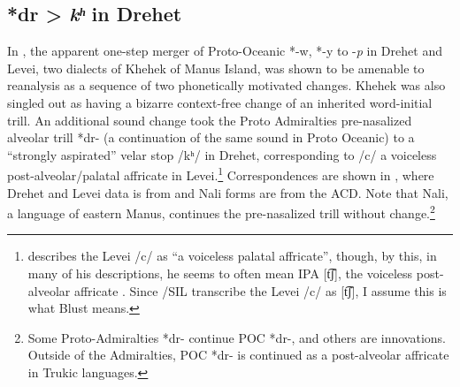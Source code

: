 \documentclass[output=paper]{langscibook}
\begin{document}
\subsection{\label{sec:blevins:3.4}*dr  > \textit{kʰ} in Drehet}
In , the apparent one-step merger of Proto-Oceanic *-w, *-y to -\textit{p} in Drehet and Levei, two dialects of Khehek of Manus Island, was shown to be amenable to reanalysis as a sequence of two phonetically motivated changes. Khehek was also singled out as having a bizarre context-free change of an inherited word-initial trill. An additional sound change took the Proto Admiralties pre-nasalized alveolar trill *dr- (a continuation of the same sound in Proto Oceanic) to a “strongly aspirated” velar stop \mbox{/kʰ/} in Drehet, corresponding to \mbox{/c/} a voiceless post-alveolar/palatal affricate in Levei.\footnote{\citet[246]{Blust2005} describes the Levei /c/ as “a voiceless palatal affricate”, though, by this, in many of his descriptions, he seems to often mean IPA [t͡ʃ], the voiceless post-alveolar affricate \citep[601]{Blust2013}. Since \citet{Beard1992}\slash SIL transcribe the Levei \mbox{/c/} as [t͡ʃ], I assume this is what Blust means.} Correspondences are shown in , where Drehet and Levei data is from \citet[247]{Blust2005} and Nali forms are from the ACD. Note that Nali, a language of eastern Manus, continues the pre-nasalized trill without change.\footnote{Some Proto-Admiralties *dr- continue POC *dr-, and others are innovations. Outside of the Admiralties, POC *dr- is continued as a post-alveolar affricate in Trukic languages.}

\begin{table}
\caption{\label{tab:blevins:12}Alveolar, velar and palatal reflexes of the Proto-Manus pre-nasalized alveolar trill (all forms but Nali from \citealt[247]{Blust2005}; Nali from ACD)}
\end{table}
\end{document}
